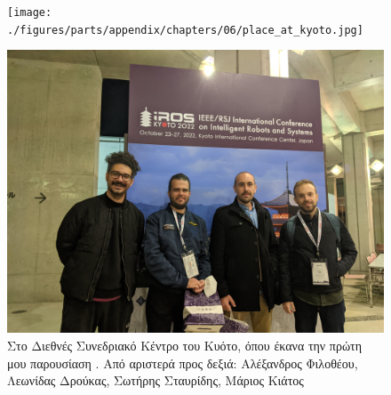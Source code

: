 \begin{figure}[H]\centering
  \texttt{[image: ./figures/parts/appendix/chapters/06/place\_at\_kyoto.jpg]}
\end{figure}
\begin{figure}[H]\centering
  \includegraphics[scale=0.1]{./figures/parts/appendix/chapters/06/at_iros2022.jpg}
  \caption{\small Στο Διεθνές Συνεδριακό Κέντρο του Κυότο, όπου έκανα την πρώτη
           μου παρουσίαση \cite{Filotheou2022i}. Από αριστερά προς δεξιά:
           Αλέξανδρος Φιλοθέου, Λεωνίδας Δρούκας, Σωτήρης Σταυρίδης, Μάριος Κιάτος}
\end{figure}


